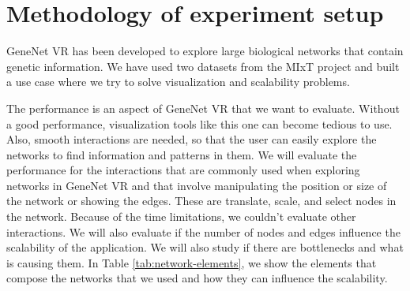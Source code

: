 \section{Methodology of experiment setup}

GeneNet VR has been developed to explore large biological networks that contain genetic information. We have used two datasets from the MIxT project \cite{dumeaux_fjukstad_interactions_tumor_blood} and built a use case where we try to solve visualization and scalability problems.

The performance is an aspect of GeneNet VR that we want to evaluate. Without a good performance, visualization tools like this one can become tedious to use. Also, smooth interactions are needed, so that the user can easily explore the networks to find information and patterns in them. We will evaluate the performance for the interactions that are commonly used when exploring networks in GeneNet VR and that involve manipulating the position or size of the network or showing the edges. These are translate, scale, and select nodes in the network. Because of the time limitations, we couldn't evaluate other interactions. We will also evaluate if the number of nodes and edges influence the scalability of the application. We will also study if there are bottlenecks and what is causing them. In Table \ref{tab:network-elements}, we show the elements that compose the networks that we used and how they can influence the scalability.

